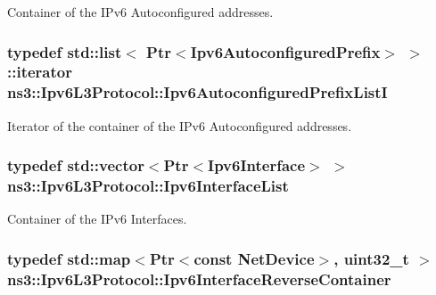 Container of the I\+Pv6 Autoconfigured addresses. 

\subsubsection[{\texorpdfstring{Ipv6\+Autoconfigured\+Prefix\+ListI}{Ipv6AutoconfiguredPrefixListI}}]{\setlength{\rightskip}{0pt plus 5cm}typedef {\bf std\+::list}$<$ {\bf Ptr}$<${\bf Ipv6\+Autoconfigured\+Prefix}$>$ $>$\+::iterator {\bf ns3\+::\+Ipv6\+L3\+Protocol\+::\+Ipv6\+Autoconfigured\+Prefix\+ListI}\hspace{0.3cm}{\ttfamily [private]}}\hypertarget{classns3_1_1Ipv6L3Protocol_af00957df9fbda1b1427ad41dd788b99a}{}\label{classns3_1_1Ipv6L3Protocol_af00957df9fbda1b1427ad41dd788b99a}


Iterator of the container of the I\+Pv6 Autoconfigured addresses. 

\subsubsection[{\texorpdfstring{Ipv6\+Interface\+List}{Ipv6InterfaceList}}]{\setlength{\rightskip}{0pt plus 5cm}typedef std\+::vector$<${\bf Ptr}$<${\bf Ipv6\+Interface}$>$ $>$ {\bf ns3\+::\+Ipv6\+L3\+Protocol\+::\+Ipv6\+Interface\+List}\hspace{0.3cm}{\ttfamily [private]}}\hypertarget{classns3_1_1Ipv6L3Protocol_a3324185c048c5bcd0a4511b8ebf166db}{}\label{classns3_1_1Ipv6L3Protocol_a3324185c048c5bcd0a4511b8ebf166db}


Container of the I\+Pv6 Interfaces. 

\subsubsection[{\texorpdfstring{Ipv6\+Interface\+Reverse\+Container}{Ipv6InterfaceReverseContainer}}]{\setlength{\rightskip}{0pt plus 5cm}typedef std\+::map$<${\bf Ptr}$<$const {\bf Net\+Device}$>$, uint32\+\_\+t $>$ {\bf ns3\+::\+Ipv6\+L3\+Protocol\+::\+Ipv6\+Interface\+Reverse\+Container}\hspace{0.3cm}{\ttfamily [private]}}\hypertarget{classns3_1_1Ipv6L3Protocol_a1fb40e4ad1a4612f73c192418df88228}{}\label{classns3_1_1Ipv6L3Protocol_a1fb40e4ad1a4612f73c192418df88228}


